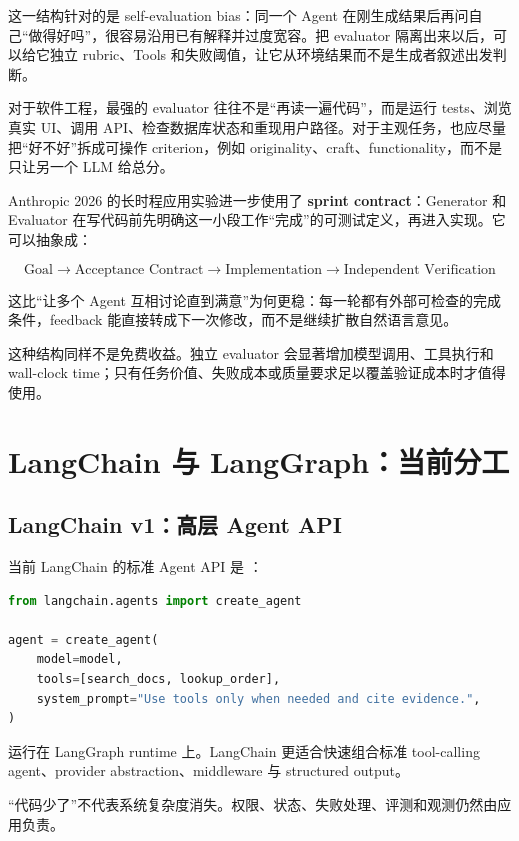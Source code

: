 \documentclass[profile=standard,twoside=false]{ipara-handbook}
\begin{document}
这一结构针对的是 self-evaluation bias：同一个 Agent 在刚生成结果后再问自己“做得好吗”，很容易沿用已有解释并过度宽容。把 evaluator 隔离出来以后，可以给它独立 rubric、Tools 和失败阈值，让它从环境结果而不是生成者叙述出发判断。

对于软件工程，最强的 evaluator 往往不是“再读一遍代码”，而是运行 tests、浏览真实 UI、调用 API、检查数据库状态和重现用户路径。对于主观任务，也应尽量把“好不好”拆成可操作 criterion，例如 originality、craft、functionality，而不是只让另一个 LLM 给总分。

Anthropic 2026 的长时程应用实验进一步使用了 \textbf{sprint contract}：Generator 和 Evaluator 在写代码前先明确这一小段工作“完成”的可测试定义，再进入实现。它可以抽象成：

$$
\boxed{
\text{Goal}
\to\text{Acceptance Contract}
\to\text{Implementation}
\to\text{Independent Verification}
}
$$

这比“让多个 Agent 互相讨论直到满意”为何更稳：每一轮都有外部可检查的完成条件，feedback 能直接转成下一次修改，而不是继续扩散自然语言意见。

这种结构同样不是免费收益。独立 evaluator 会显著增加模型调用、工具执行和 wall-clock time；只有任务价值、失败成本或质量要求足以覆盖验证成本时才值得使用。

\section{LangChain 与 LangGraph：当前分工}

\subsection{LangChain v1：高层 Agent API}

当前 LangChain 的标准 Agent API 是 ：

\begin{lstlisting}[language=Python]
from langchain.agents import create_agent

agent = create_agent(
    model=model,
    tools=[search_docs, lookup_order],
    system_prompt="Use tools only when needed and cite evidence.",
)
\end{lstlisting}

 运行在 LangGraph runtime 上。LangChain 更适合快速组合标准 tool-calling agent、provider abstraction、middleware 与 structured output。

“代码少了”不代表系统复杂度消失。权限、状态、失败处理、评测和观测仍然由应用负责。
\end{document}
